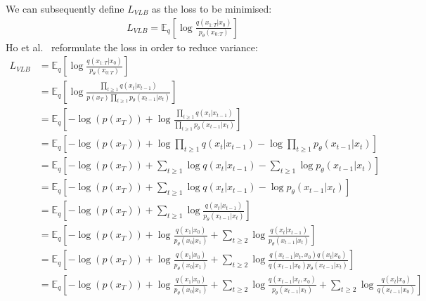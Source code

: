 \documentclass{article}
\numberwithin{equation}{section}
\numberwithin{figure}{section}
\begin{document}
{We can subsequently define $L_{VLB}$ as the loss to be minimised:
\begin{gather}
  L_{VLB} = \mathbb{E}_q \left[\log \frac{q\left(x_{1:T}|x_0\right)}{p_{\theta}\left(x_{0:T}\right)}\right] 
\end{gather}
Ho et al.~\cite{ho2020denoising} reformulate the loss in order to reduce variance:
\begin{align}
  L_{VLB} &= \mathbb{E}_q \left[\log \frac{q\left(x_{1:T}|x_0\right)}{p_{\theta}\left(x_{0:T}\right)}\right] \\
  &= \mathbb{E}_q \left[\log \frac{\prod_{t \geq 1} q\left(x_t | x_{t-1}\right)}{p \left(x_T\right) \prod_{t \geq 1} p_{\theta}\left(x_{t-1} | x_t\right)}\right] \\
  &= \mathbb{E}_q \left[-\log\left(p \left(x_T\right)\right) + \log \frac{\prod_{t \geq 1} q\left(x_t | x_{t-1}\right)}{\prod_{t \geq 1} p_{\theta}\left(x_{t-1} | x_t\right)}\right] \\
  &= \mathbb{E}_q \left[-\log\left(p \left(x_T\right)\right) + \log \prod_{t \geq 1} q\left(x_t | x_{t-1}\right) - \log \prod_{t \geq 1} p_{\theta}\left(x_{t-1} | x_t\right)\right] \\
  &= \mathbb{E}_q \left[-\log\left(p \left(x_T\right)\right) + \sum_{t \geq 1} \log q\left(x_t | x_{t-1}\right) - \sum_{t \geq 1} \log p_{\theta}\left(x_{t-1} | x_t\right)\right] \\
  &= \mathbb{E}_q \left[-\log\left(p \left(x_T\right)\right) + \sum_{t \geq 1} \log q\left(x_t | x_{t-1}\right) - \log p_{\theta}\left(x_{t-1} | x_t\right)\right] \\
  &= \mathbb{E}_q \left[-\log\left(p \left(x_T\right)\right) + \sum_{t \geq 1} \log \frac{q\left(x_t | x_{t-1}\right)}{p_{\theta}\left(x_{t-1} | x_t\right)}\right] \\
  &= \mathbb{E}_q \left[-\log\left(p \left(x_T\right)\right) + \log \frac{q\left(x_1 | x_0\right)}{p_{\theta}\left(x_0 | x_1\right)} + \sum_{t \geq 2} \log \frac{q\left(x_t | x_{t-1}\right)}{p_{\theta}\left(x_{t-1} | x_t\right)}\right] \\
  &= \mathbb{E}_q \left[-\log\left(p \left(x_T\right)\right) + \log \frac{q\left(x_1 | x_0\right)}{p_{\theta}\left(x_0 | x_1\right)} + \sum_{t \geq 2} \log \frac{q\left(x_{t-1} | x_t, x_0\right) q\left(x_t | x_0\right)}{{q\left(x_{t-1} | x_0\right)} p_{\theta}\left(x_{t-1} | x_t\right)}\right] \label{eq:conditionedq}\\
  &= \mathbb{E}_q \left[-\log\left(p \left(x_T\right)\right) + \log \frac{q\left(x_1 | x_0\right)}{p_{\theta}\left(x_0 | x_1\right)} + \sum_{t \geq 2} \log \frac{q\left(x_{t-1} | x_t, x_0\right)}{p_{\theta}\left(x_{t-1} | x_t\right)} + \sum_{t \geq 2} \log \frac{q\left(x_t | x_0\right)}{q\left(x_{t-1} | x_0\right)}\right] \\

\end{align}}
\end{document}
